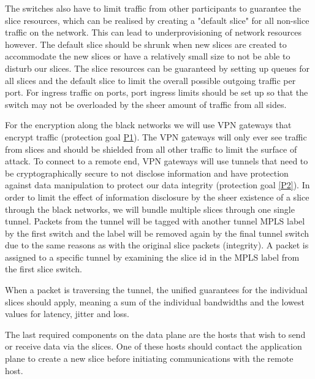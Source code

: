 The switches also have to limit traffic from other participants to guarantee the slice resources, which can be realised by creating a "default slice" for all non-slice traffic on the network. This can lead to underprovisioning of network resources however. The default slice should be shrunk when new slices are created to accommodate the new slices or have a relatively small size to not be able to disturb our slices. The slice resources can be guaranteed by setting up queues for all slices and the default slice to limit the overall possible outgoing traffic per port. For ingress traffic on ports, port ingress limits should be set up so that the switch may not be overloaded by the sheer amount of traffic from all sides.

For the encryption along the black networks we will use VPN gateways that encrypt traffic (protection goal \hyperref[P1]{P1}). The VPN gateways will only ever see traffic from slices and should be shielded from all other traffic to limit the surface of attack. To connect to a remote end, VPN gateways will use tunnels that need to be cryptographically secure to not disclose information and have protection against data manipulation to protect our data integrity (protection goal \ref{P2}). In order to limit the effect of information disclosure by the sheer existence of a slice through the black networks, we will bundle multiple slices through one single tunnel. Packets from the tunnel will be tagged with another tunnel MPLS label by the first switch and the label will be removed again by the final tunnel switch due to the same reasons as with the original slice packets (integrity). A packet is assigned to a specific tunnel by examining the slice id in the MPLS label from the first slice switch.


When a packet is traversing the tunnel, the unified guarantees for the individual slices should apply, meaning a sum of the individual bandwidths and the lowest values for latency, jitter and loss.

The last required components on the data plane are the hosts that wish to send or receive data via the slices. One of these hosts should contact the application plane to create a new slice before initiating communications with the remote host.

